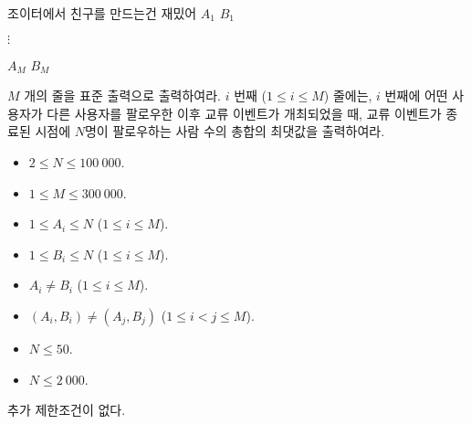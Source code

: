 \begin{problem}{조이터에서 친구를 만드는건 재밌어}
$A_1$ $B_1$

$\vdots$

$A_M$ $B_M$

\OutputFile

$M$ 개의 줄을 표준 출력으로 출력하여라. $i$ 번째 ($1 \le i \le M$) 줄에는, $i$ 번째에 어떤 사용자가 다른 사용자를 팔로우한 이후 교류 이벤트가 개최되었을 때, 교류 이벤트가 종료된 시점에 $N$명이 팔로우하는 사람 수의 총합의 최댓값을 출력하여라.

\Constraints

\begin{itemize}
	\item $2 \le N \le 100\ 000$.
	\item $1 \le M \le 300\ 000$.
	\item $1 \le A_i \le N$ ($1 \le i \le M$).
	\item $1 \le B_i \le N$ ($1 \le i \le M$).
	\item $A_i \ne B_i$ ($1 \le i \le M$).
	\item $(A_i, B_i) \ne (A_j, B_j)$ ($1 \le i < j \le M$).
\end{itemize}


\begin{itemize}
	\item $N \le 50$.
\end{itemize}

\begin{itemize}
	\item $N \le 2\ 000$.
\end{itemize}


추가 제한조건이 없다.

\Examples

\begin{example}
\end{example}


\end{problem}
